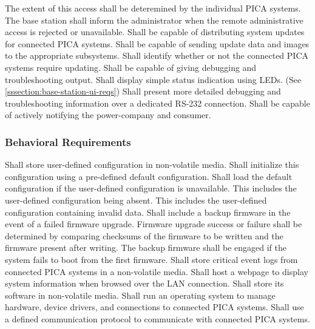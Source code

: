 \begin{outline}[enumerate]
 \2 The extent of this access shall be deteremined by the individual PICA systems.
 \2 The base station shall inform the administrator when the remote administrative access is rejected or unavailable.
\1 Shall be capable of distributing system updates for connected PICA systems.
 \2 Shall be capable of sending update data and images to the appropriate subsystems.
 \2 Shall identify whether or not the connected PICA systems require updating.
\1 Shall be capable of giving debugging and troubleshooting output.
 \2 Shall display simple status indication using \acp{LED}. (See \ref{sssection:base-station-ui-reqs})
 \2 Shall present more detailed debugging and troubleshooting information over a dedicated RS-232 connection.
\1 Shall be capable of actively notifying the power-company and consumer.
\end{outline}

\subsubsection{Behavioral Requirements}
\begin{outline}[enumerate]
\1 Shall store user-defined configuration in non-volatile media.
 \2 Shall initialize this configuration using a pre-defined default configuration.
 \2 Shall load the default configuration if the user-defined configuration is unavailable.
  \3 This includes the user-defined configuration being absent.
  \3 This includes the user-defined configuration containing invalid data.
\1 Shall include a backup firmware in the event of a failed firmware upgrade.
 \2 Firmware upgrade success or failure shall be determined by comparing checksums of the firmware to be written and the firmware present after writing.
 \2 The backup firmware shall be engaged if the system fails to boot from the first firmware.
\1 Shall store critical event logs from connected PICA systems in a non-volatile media.
\1 Shall host a webpage to display system information when browsed over the \ac{LAN} connection.
\1 Shall store its software in non-volatile media.
\1 Shall run an operating system to manage hardware, device drivers, and connections to connected PICA systems.
\1 Shall use a defined communication protocol to communicate with connected PICA systems.
\end{outline}

